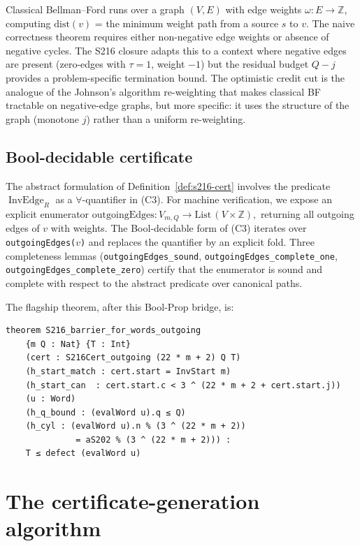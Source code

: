 \documentclass[11pt,a4paper]{article}
\theoremstyle{plain}
\theoremstyle{definition}
\newcommand{\ZZ}{\mathbb{Z}}
\DeclareMathOperator{\InvEdge}{InvEdge}
\begin{document}
Classical Bellman--Ford runs over a graph $(V, E)$ with edge
weights $\omega: E \to \ZZ$, computing $\mathrm{dist}(v)$ = the
minimum weight path from a source $s$ to $v$. The naive
correctness theorem requires either non-negative edge weights or
absence of negative cycles. The S216 closure adapts this to a
context where negative edges are present (zero-edges with
$\tau = 1$, weight $-1$) but the residual budget $Q - j$ provides
a problem-specific termination bound. The optimistic credit cut is
the analogue of the Johnson's algorithm
re-weighting that makes classical BF tractable on negative-edge
graphs, but more specific: it uses the structure of the graph
(monotone $j$) rather than a uniform re-weighting.

\subsection{Bool-decidable certificate}

The abstract formulation of Definition~\ref{def:s216-cert} involves
the predicate $\InvEdge_R$ as a $\forall$-quantifier in (C3). For
machine verification, we expose an explicit enumerator
\(
   \mathrm{outgoingEdges} : V_{m, Q} \to \mathrm{List}\,(V \times \ZZ),
\)
returning all outgoing edges of $v$ with weights. The Bool-decidable
form of (C3) iterates over \texttt{outgoingEdges($v$)} and replaces
the quantifier by an explicit fold. Three completeness lemmas
(\texttt{outgoingEdges\_sound},
 \texttt{outgoingEdges\_complete\_one},
 \texttt{outgoingEdges\_complete\_zero}) certify that the enumerator
is sound and complete with respect to the abstract predicate over
canonical paths.

The flagship theorem, after this Bool-Prop bridge, is:

\begin{lstlisting}
theorem S216_barrier_for_words_outgoing
    {m Q : Nat} {T : Int}
    (cert : S216Cert_outgoing (22 * m + 2) Q T)
    (h_start_match : cert.start = InvStart m)
    (h_start_can  : cert.start.c < 3 ^ (22 * m + 2 + cert.start.j))
    (u : Word)
    (h_q_bound : (evalWord u).q ≤ Q)
    (h_cyl : (evalWord u).n % (3 ^ (22 * m + 2))
              = aS202 % (3 ^ (22 * m + 2))) :
    T ≤ defect (evalWord u)
\end{lstlisting}

\section{The certificate-generation algorithm}\label{sec:algorithm}
\end{document}
